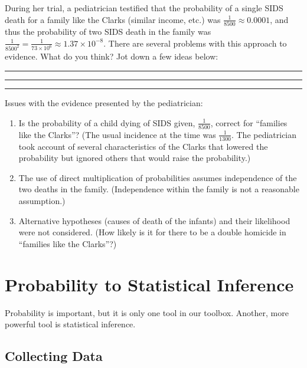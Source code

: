 \documentclass[]{book}
\providecommand{\tightlist}{%
  \setlength{\itemsep}{0pt}\setlength{\parskip}{0pt}}
\theoremstyle{definition}
\theoremstyle{definition}
\theoremstyle{remark}
\begin{document}
During her trial, a pediatrician testified that the probability of a
single SIDS death for a family like the Clarks (similar income, etc.)
was \(\frac{1}{8500}\approx 0.0001\), and thus the probability of two
SIDS death in the family was
\(\frac{1}{8500^2} = \frac{1}{73 \times 10^6} \approx 1.37 \times 10^{-8}\).
There are several problems with this approach to evidence. What do you
think? Jot down a few ideas below: \vspace{.1in}

\rule{\textwidth}{.4pt}

\vspace{.1in}

\rule{\textwidth}{.4pt}

\vspace{.1in}

\rule{\textwidth}{.4pt}

\vspace{.1in}

Issues with the evidence presented by the pediatrician:

\begin{enumerate}
\def\labelenumi{\arabic{enumi}.}
\tightlist
\item
  Is the probability of a child dying of SIDS given, \(\frac{1}{8500}\),
  correct for ``families like the Clarks''? (The usual incidence at the
  time was \(\frac{1}{1300}\). The pediatrician took account of several
  characteristics of the Clarks that lowered the probability but ignored
  others that would raise the probability.)
\item
  The use of direct multiplication of probabilities assumes independence
  of the two deaths in the family. (Independence within the family is
  not a reasonable assumption.)
\item
  Alternative hypotheses (causes of death of the infants) and their
  likelihood were not considered. (How likely is it for there to be a
  double homicide in ``families like the Clarks''?)
\end{enumerate}

\section{Probability to Statistical
Inference}\label{probability-to-statistical-inference}

Probability is important, but it is only one tool in our toolbox.
Another, more powerful tool is statistical inference.

\subsection{Collecting Data}\label{collecting-data}
\end{document}

